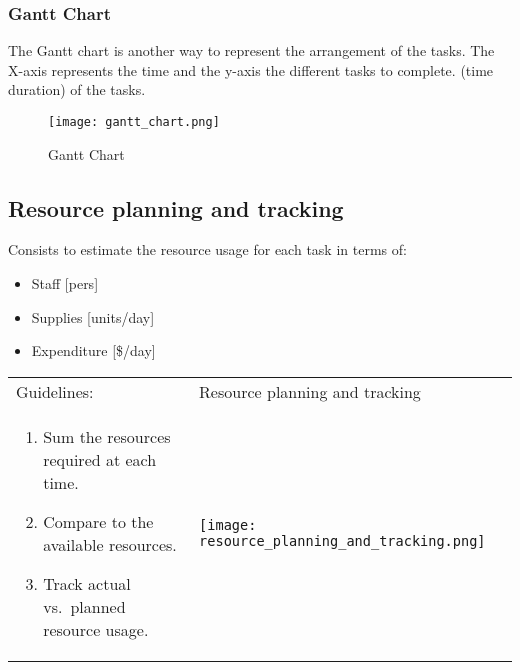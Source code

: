 \subsubsection{Gantt Chart}

The Gantt chart is another way to represent the arrangement of the
tasks. The X-axis represents the time and the y-axis the different tasks
to complete. (time duration) of the tasks.

\begin{figure}[!ht]
    \centering
    \texttt{[image: gantt\_chart.png]}
    \caption{Gantt Chart}
\end{figure}
\FloatBarrier{}


\subsection{Resource planning and tracking}

Consists to estimate the resource usage for each task in terms of:
\begin{itemize}
    \item Staff [pers]
    \item Supplies [units/day]
    \item Expenditure [\$/day]
\end{itemize}

\begin{tabular}{m{8cm}m{9cm}}
    Guidelines: & Resource planning and tracking \\
\begin{enumerate}
 \item Sum the resources required at each time.
 \item Compare to the available resources.
 \item Track actual vs.\ planned resource usage.
\end{enumerate}
&
    \texttt{[image: resource\_planning\_and\_tracking.png]}
    \end{tabular}
